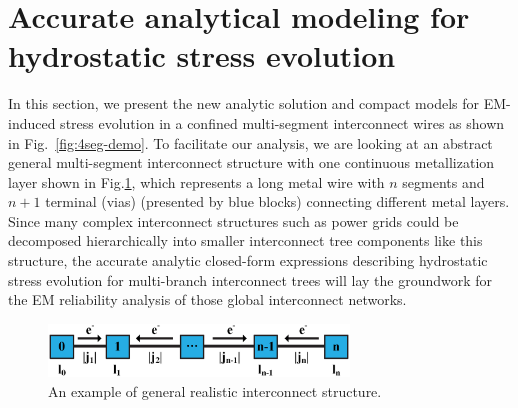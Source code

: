 \section{Accurate analytical modeling for hydrostatic stress evolution}
\label{sec:multi_segment}

In this section, we present the new analytic solution and compact
models for EM-induced stress evolution in a confined multi-segment
interconnect wires as shown in Fig.~\ref{fig:4seg-demo}. To facilitate
our analysis, we are looking at an abstract general multi-segment
interconnect structure with one continuous metallization layer shown in
Fig.\ref{fig:interconnect_tree}, which represents a long metal wire
with $n$ segments and $n+1$ terminal (vias) (presented by blue blocks)
connecting different metal layers.  Since many complex interconnect
structures such as power grids could be decomposed hierarchically into
smaller interconnect tree components like this structure, the accurate
analytic closed-form expressions describing hydrostatic stress
evolution for multi-branch interconnect trees will lay the groundwork
for the EM reliability analysis of those global interconnect networks.

\label{sec:analytical_stress}
\begin{figure}[ht] \centering
\includegraphics[width=80mm]{Sn.eps}
\caption{An example of general realistic interconnect structure.}
  \label{fig:interconnect_tree}
  \vspace{-0.12in}
\end{figure}


